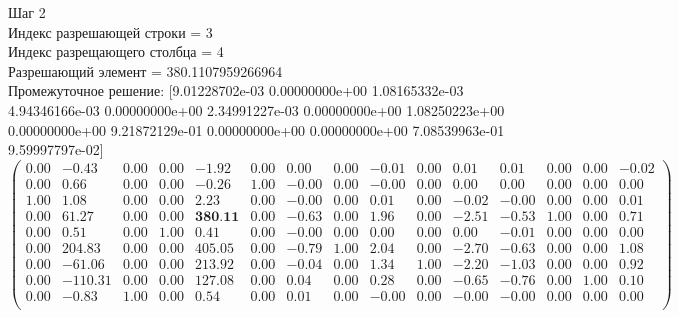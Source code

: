 \documentclass{article}
\begin{document}
\begin{flushleft}
    Шаг 2 \\
Индекс разрешающей строки = 3\\
Индекс разрещающего столбца = 4\\
Разрешающий элемент = 380.1107959266964\\
Промежуточное решение:
 [9.01228702e-03 0.00000000e+00 1.08165332e-03 4.94346166e-03
 0.00000000e+00 2.34991227e-03 0.00000000e+00 1.08250223e+00
 0.00000000e+00 9.21872129e-01 0.00000000e+00 0.00000000e+00
 7.08539963e-01 9.59997797e-02]
\begin{equation*}
\begin{pmatrix}
 0.00 &   -0.43 & 0.00 & 0.00 &  -1.92 & 0.00 &  0.00 & 0.00 & -0.01 & 0.00 &  0.01 &  0.01 & 0.00 & 0.00 & -0.02 \\
 0.00 &    0.66 & 0.00 & 0.00 &  -0.26 & 1.00 & -0.00 & 0.00 & -0.00 & 0.00 &  0.00 &  0.00 & 0.00 & 0.00 &  0.00 \\
 1.00 &    1.08 & 0.00 & 0.00 &   2.23 & 0.00 & -0.00 & 0.00 &  0.01 & 0.00 & -0.02 & -0.00 & 0.00 & 0.00 &  0.01 \\
 0.00 &   61.27 & 0.00 & 0.00 & \textbf{380.11} & 0.00 & -0.63 & 0.00 &  1.96 & 0.00 & -2.51 & -0.53 & 1.00 & 0.00 &  0.71 \\
 0.00 &    0.51 & 0.00 & 1.00 &   0.41 & 0.00 & -0.00 & 0.00 &  0.00 & 0.00 &  0.00 & -0.01 & 0.00 & 0.00 &  0.00 \\
 0.00 &  204.83 & 0.00 & 0.00 & 405.05 & 0.00 & -0.79 & 1.00 &  2.04 & 0.00 & -2.70 & -0.63 & 0.00 & 0.00 &  1.08 \\
 0.00 &  -61.06 & 0.00 & 0.00 & 213.92 & 0.00 & -0.04 & 0.00 &  1.34 & 1.00 & -2.20 & -1.03 & 0.00 & 0.00 &  0.92 \\
 0.00 & -110.31 & 0.00 & 0.00 & 127.08 & 0.00 &  0.04 & 0.00 &  0.28 & 0.00 & -0.65 & -0.76 & 0.00 & 1.00 &  0.10 \\
 0.00 &   -0.83 & 1.00 & 0.00 &   0.54 & 0.00 &  0.01 & 0.00 & -0.00 & 0.00 & -0.00 & -0.00 & 0.00 & 0.00 &  0.00 \\
\end{pmatrix}
\end{equation*}
\end{flushleft}
\end{document}
